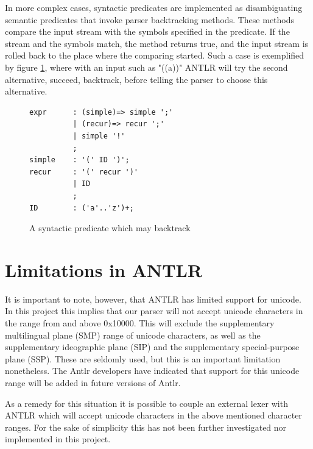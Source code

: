 In more complex cases, syntactic predicates are implemented as disambiguating semantic predicates that invoke parser backtracking methods. These methods compare the input stream with the symbols specified in the predicate. If the stream and the symbols match, the method returns true, and the input stream is rolled back to the place where the comparing started. Such a case is exemplified by figure \ref{code:complexSyntactic}, where with an input such as "((a))" ANTLR will try the second alternative, succeed, backtrack, before telling the parser to choose this alternative.
\begin{figure}[h!]
\begin{verbatim}
expr      : (simple)=> simple ';'
          | (recur)=> recur ';'  
          | simple '!'
          ;
simple    : '(' ID ')';
recur     : '(' recur ')'
          | ID
          ;
ID        : ('a'..'z')+;
\end{verbatim}
\caption{A syntactic predicate which may backtrack}
\label{code:complexSyntactic}
\end{figure}

\section{Limitations in ANTLR}
\label{sect:parserconstructanddebug:limitations}
It is important to note, however, that ANTLR has limited support for unicode.
In this project this implies that our parser will not accept unicode characters
in the range from and above 0x10000. This will exclude the supplementary
multilingual plane (SMP) range of unicode characters, as well as the
supplementary ideographic plane (SIP) and the supplementary special-purpose
plane (SSP). These are seldomly used, but this is an important limitation
nonetheless. The Antlr developers have indicated that support for this unicode
range will be added in future versions of Antlr.

As a remedy for this situation it is possible to couple an external lexer with
ANTLR which will accept unicode characters in the above mentioned character
ranges. For the sake of simplicity this has not been further investigated nor
implemented in this project.
